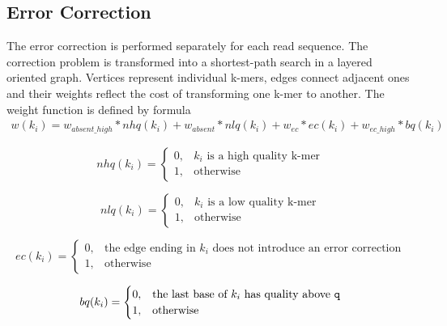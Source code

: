 \subsection{Error Correction}
\label{subsec:fermi-error-correction}

The error correction is performed separately for each read sequence. The correction problem is transformed into a shortest-path search in a layered oriented graph. Vertices represent individual k-mers, edges connect adjacent ones and their weights reflect the cost of transforming one k-mer to another. The weight function is defined by formula
\begin{align*}
	w(k_i) = w_{absent\_high}*nhq(k_i) + w_{absent}*nlq(k_i) + w_{ec}*ec(k_i) + w_{ec\_high}*bq(k_i)
\end{align*}

\begin{equation*}
nhq(k_i) = 
	\begin{cases}
		0, & \text{$k_i$ is a high quality k-mer} \\
		1, & \text{otherwise}
	\end{cases}
\end{equation*}
	
\begin{equation*}
nlq(k_i) = 
	\begin{cases}
		0, & \text{$k_i$ is a low quality k-mer} \\
		1, & \text{otherwise}
	\end{cases}
\end{equation*}

\begin{equation*}
ec(k_i) = 
	\begin{cases}
		0, & \text{the edge ending in $k_i$ does not introduce an error correction} \\
		1, & \text{otherwise}
	\end{cases}
\end{equation*}

\begin{equation*}
bq(k_i) = 
	\begin{cases}
		0, & \text{the last base of $k_i$ has quality above \texttt{q}} \\
		1, & \text{otherwise}
	\end{cases}
\end{equation*}

